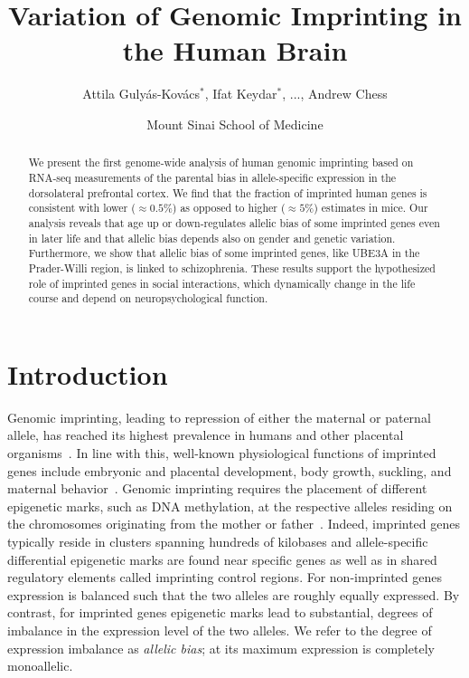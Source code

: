 \documentclass[12pt,letterpaper]{article}
\title{Variation of Genomic Imprinting in the Human Brain}
\author{Attila Guly\'{a}s-Kov\'{a}cs\(^\ast\), Ifat Keydar\(^\ast\),
...,
Andrew Chess}
\date{Mount Sinai School of Medicine}
\begin{document}
\maketitle

\begin{abstract}
We present the first genome-wide analysis of human genomic imprinting based on
RNA-seq measurements of the parental bias in allele-specific expression in the
dorsolateral prefrontal cortex.  We find that the fraction of imprinted human
genes is consistent with lower (\(\approx 0.5\%\)) as opposed to higher
(\(\approx 5\%\)) estimates in mice.  Our analysis reveals that age up or
down-regulates allelic bias of some imprinted genes even in later life and
that allelic bias depends also on gender and genetic variation.  Furthermore,
we show that allelic bias of some imprinted genes, like UBE3A in the
Prader-Willi region, is linked to schizophrenia.  These results support the
hypothesized role of imprinted genes in social interactions, which dynamically
change in the life course and depend on neuropsychological function.
\end{abstract}

\section{Introduction}

Genomic imprinting, leading to repression of either the maternal or paternal
allele, has reached its highest prevalence in humans and other placental
organisms~\cite{Renfree2012}.  In line with this, well-known physiological
functions of imprinted genes include embryonic and placental development, body
growth, suckling, and maternal behavior~\cite{Plasschaert2014,Peters2014}.
Genomic imprinting requires the placement of different epigenetic marks, such
as DNA methylation, at the respective alleles residing on the chromosomes
originating from the mother or father~\cite{Plasschaert2014}.  Indeed,
imprinted genes typically reside in clusters spanning hundreds of kilobases
and allele-specific differential epigenetic marks are found near specific
genes as well as in shared regulatory elements called imprinting control
regions. For non-imprinted genes expression is balanced such that the two
alleles are roughly equally expressed. By contrast, for imprinted genes
epigenetic marks lead to substantial, degrees of
imbalance in the expression level of the two alleles.  We refer to the degree
of expression imbalance as \emph{allelic bias}; at its maximum expression is
completely monoallelic.
\end{document}
